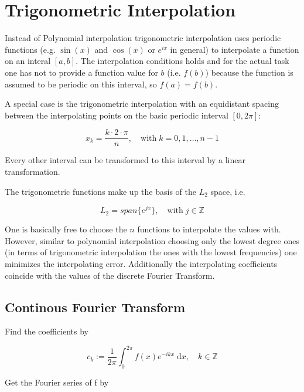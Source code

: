 \documentclass[
    a4paper,
    11pt
]{article}
\begin{document}
\section{Trigonometric Interpolation}

Instead of Polynomial interpolation trigonometric interpolation uses periodic
functions (e.g. $\sin(x)$ and $\cos(x)$ or $e^{ix}$ in general) to interpolate a
function on an interal $[a, b]$. The interpolation conditions holds and for the
actual task one has not to provide a function value for $b$ (i.e. $f(b)$)
because the function is assumed to be periodic on this interval, so $f(a) =
f(b)$.

A special case is the trigonometric interpolation with an equidistant spacing
between the interpolating points on the basic periodic interval $[0, 2\pi]$:

\begin{equation}
    x_k = \frac{k\cdot 2 \cdot \pi}{n}, \quad \text{with} \; k=0, 1, \dots, n-1
\end{equation}

Every other interval can be transformed to this interval by a linear
transformation.

The trigonometric functions make up the basis of the $L_2$ space, i.e.

\begin{equation}
    L_2 = span \{e^{jx} \}, \quad \text{with} \; j \in \mathbb{Z}
\end{equation}

One is basically free to choose the $n$ functions to interpolate the values
with. However, similar to polynomial interpolation choosing only the lowest
degree ones (in terms of trigonometric interpolation the ones with the lowest
frequencies) one minimizes the interpolating error. Additionally the
interpolating coefficients coincide with the values of the discrete Fourier
Transform.

\subsection{Continous Fourier Transform}

Find the coefficients by 

\begin{equation}
    c_k := \frac{1}{2\pi} \int_0^{2\pi} f(x) e^{-ikx} \; \mathrm{d} x, \quad k
    \in \mathbb{Z}
\end{equation}

Get the Fourier series of f by
\end{document}
